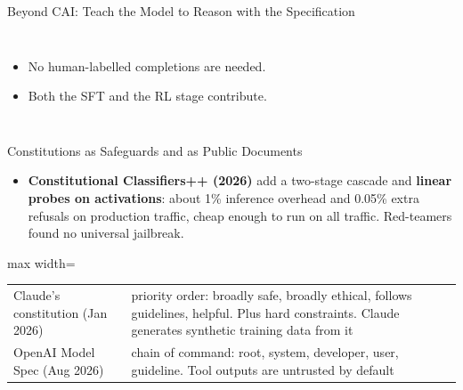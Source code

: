 \begin{frame}{Beyond CAI: Teach the Model to Reason with the Specification}
\begin{columns}[T,onlytextwidth]
        \vspace{0.8em}
        \begin{itemize}\itemsep0.3em
            \item No human-labelled completions are needed.
            \item Both the SFT and the RL stage contribute.
        \end{itemize}
    \end{columns}
    \vspace{0.3em}
\end{frame}

\begin{frame}{Constitutions as Safeguards and as Public Documents}
    \begin{itemize}\itemsep0.35em
        \item \textbf{Constitutional Classifiers++ (2026)} add a two-stage cascade and \textbf{linear probes on activations}: about 1\% inference overhead and 0.05\% extra refusals on production traffic, cheap enough to run on all traffic. Red-teamers found no universal jailbreak.
    \end{itemize}
    \vspace{0.3em}
    \begin{center}
    \small
    \begin{adjustbox}{max width=\linewidth}\begin{tabular}{>{\raggedright\arraybackslash}p{3.6cm}>{\raggedright\arraybackslash}p{9.7cm}}
        \toprule
        Claude's constitution (Jan 2026) & priority order: broadly safe, broadly ethical, follows guidelines, helpful. Plus hard constraints. Claude generates synthetic training data from it \\
        OpenAI Model Spec (Aug 2026) & chain of command: root, system, developer, user, guideline. Tool outputs are untrusted by default \\
        \bottomrule
    \end{tabular}\end{adjustbox}
    \end{center}
\end{frame}

